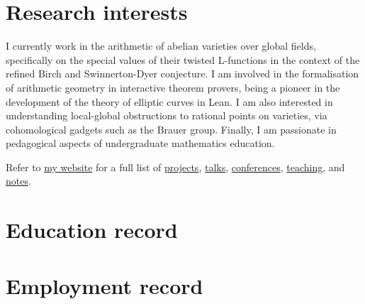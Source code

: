 \documentclass[10pt]{moderncv}
\begin{document}
\makecvtitle

\section{Research interests}

I currently work in the arithmetic of abelian varieties over global fields, specifically on the special values of their twisted L-functions in the context of the refined Birch and Swinnerton-Dyer conjecture. I am involved in the formalisation of arithmetic geometry in interactive theorem provers, being a pioneer in the development of the theory of elliptic curves in Lean. I am also interested in understanding local-global obstructions to rational points on varieties, via cohomological gadgets such as the Brauer group. Finally, I am passionate in pedagogical aspects of undergraduate mathematics education.

\vspace{0.5cm}

Refer to \href{https://multramate.github.io}{my website} for a full list of \href{https://multramate.github.io/projects/}{projects}, \href{https://multramate.github.io/talks/}{talks}, \href{https://multramate.github.io/conferences/}{conferences}, \href{https://multramate.github.io/teaching/}{teaching}, and \href{https://multramate.github.io/notes/}{notes}.

\section{Education record}

\vspace{-0.1cm}

\section{Employment record}
\end{document}
